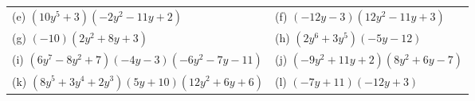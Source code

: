 \begin{enumerate}[noitemsep, label=\textbf{\arabic*}. ]
{{\begin{center}
\begin{xtabular}[t]{|l|l|}
        (e) $\left(10{y}^{5}+3\right)\left(-2{y}^{2}-11y+2\right)$ &
        (f) $\left(-12y-3\right)\left(12{y}^{2}-11y+3\right)$%
     \tabularnewline{}
        (g) $\left(-10\right)\left(2{y}^{2}+8y+3\right)$ &
        (h) $\left(2{y}^{6}+3{y}^{5}\right)\left(-5y-12\right)$%
     \tabularnewline{}
        (i) $\left(6{y}^{7}-8{y}^{2}+7\right)\left(-4y-3\right)\left(-6{y}^{2}-7y-11\right)$ &
        (j) $\left(-9{y}^{2}+11y+2\right)\left(8{y}^{2}+6y-7\right)$%
     \tabularnewline{}
        (k) $\left(8{y}^{5}+3{y}^{4}+2{y}^{3}\right)\left(5y+10\right)\left(12{y}^{2}+6y+6\right)$ &
        (l) $\left(-7y+11\right)\left(-12y+3\right)$%
     \tabularnewline{}

\end{xtabular}
\end{center}}}
\end{enumerate}
